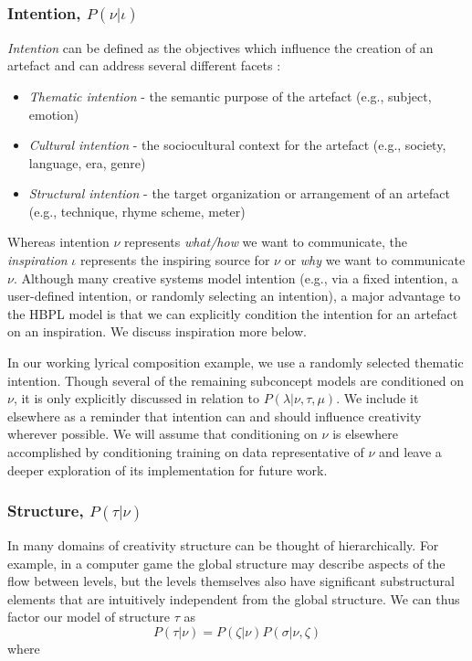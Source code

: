 \documentclass[phd,electronic,oneside,twosidetoc,letterpaper,chaptercenter,parttop,lof,lot]{byumsphd}
\begin{document}
\subsubsection{Intention, $P(\nu|\iota)$}

\emph{Intention} can be defined as the objectives which influence the creation of an artefact and can address several different facets \cite{bay2017ICCC}:

\begin{itemize}  
\item \emph{Thematic intention} - the semantic purpose of the artefact (e.g., subject, emotion)
\item \emph{Cultural intention} - the sociocultural context for the artefact (e.g., society, language, era, genre)
\item \emph{Structural intention} - the target organization or arrangement of an artefact (e.g., technique, rhyme scheme, meter)
\end{itemize}

Whereas intention $\nu$ represents \emph{what/how} we want to communicate, the \emph{inspiration} $\iota$ represents the inspiring source for $\nu$ or \emph{why} we want to communicate $\nu$. Although many creative systems model intention (e.g., via a fixed intention, a user-defined intention, or randomly selecting an intention), a major advantage to the HBPL model is that we can explicitly condition the intention for an artefact on an inspiration. We discuss inspiration more below. 

In our working lyrical composition example, we use a randomly selected thematic intention. Though several of the remaining subconcept models are conditioned on $\nu$, it is only explicitly discussed in relation to $P(\lambda|\nu,\tau,\mu)$. We include it elsewhere as a reminder that intention can and should influence creativity wherever possible. We will assume that conditioning on $\nu$ is elsewhere accomplished by conditioning training on data representative of $\nu$ and leave a deeper exploration of its implementation for future work.

\subsubsection{Structure, $P(\tau|\nu)$}

In many domains of creativity structure can be thought of hierarchically. For example, in a computer game the global structure may describe aspects of the flow between levels, but the levels themselves also have significant substructural elements that are intuitively independent from the global structure. We can thus factor our model of structure $\tau$ as
\[ P(\tau|\nu) = P(\zeta|\nu)P(\sigma|\nu,\zeta) \]
\noindent where 
\end{document}
